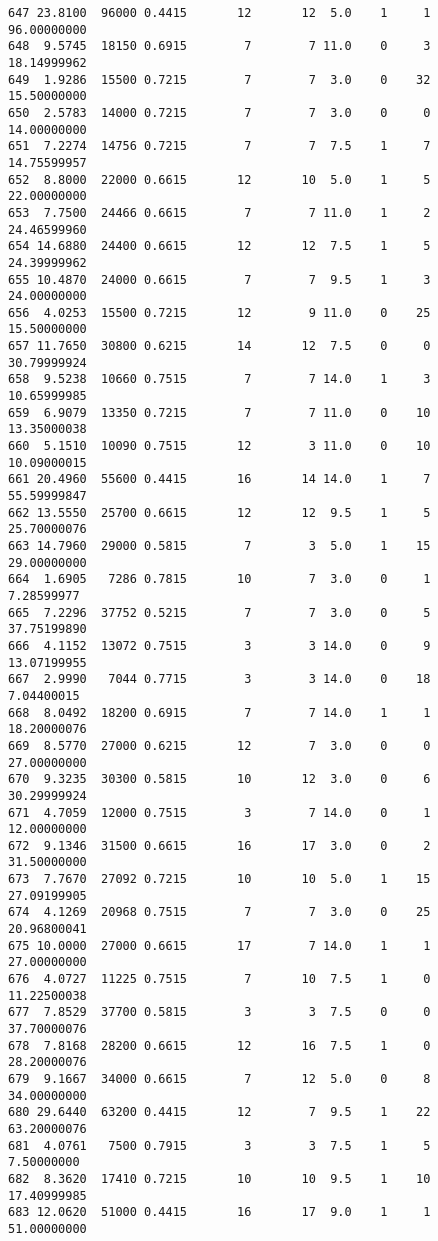 \documentclass[
  letterpaper,
  DIV=11,
  numbers=noendperiod]{scrreprt}
\begin{document}
\begin{verbatim}
647 23.8100  96000 0.4415       12       12  5.0    1     1 96.00000000
648  9.5745  18150 0.6915        7        7 11.0    0     3 18.14999962
649  1.9286  15500 0.7215        7        7  3.0    0    32 15.50000000
650  2.5783  14000 0.7215        7        7  3.0    0     0 14.00000000
651  7.2274  14756 0.7215        7        7  7.5    1     7 14.75599957
652  8.8000  22000 0.6615       12       10  5.0    1     5 22.00000000
653  7.7500  24466 0.6615        7        7 11.0    1     2 24.46599960
654 14.6880  24400 0.6615       12       12  7.5    1     5 24.39999962
655 10.4870  24000 0.6615        7        7  9.5    1     3 24.00000000
656  4.0253  15500 0.7215       12        9 11.0    0    25 15.50000000
657 11.7650  30800 0.6215       14       12  7.5    0     0 30.79999924
658  9.5238  10660 0.7515        7        7 14.0    1     3 10.65999985
659  6.9079  13350 0.7215        7        7 11.0    0    10 13.35000038
660  5.1510  10090 0.7515       12        3 11.0    0    10 10.09000015
661 20.4960  55600 0.4415       16       14 14.0    1     7 55.59999847
662 13.5550  25700 0.6615       12       12  9.5    1     5 25.70000076
663 14.7960  29000 0.5815        7        3  5.0    1    15 29.00000000
664  1.6905   7286 0.7815       10        7  3.0    0     1  7.28599977
665  7.2296  37752 0.5215        7        7  3.0    0     5 37.75199890
666  4.1152  13072 0.7515        3        3 14.0    0     9 13.07199955
667  2.9990   7044 0.7715        3        3 14.0    0    18  7.04400015
668  8.0492  18200 0.6915        7        7 14.0    1     1 18.20000076
669  8.5770  27000 0.6215       12        7  3.0    0     0 27.00000000
670  9.3235  30300 0.5815       10       12  3.0    0     6 30.29999924
671  4.7059  12000 0.7515        3        7 14.0    0     1 12.00000000
672  9.1346  31500 0.6615       16       17  3.0    0     2 31.50000000
673  7.7670  27092 0.7215       10       10  5.0    1    15 27.09199905
674  4.1269  20968 0.7515        7        7  3.0    0    25 20.96800041
675 10.0000  27000 0.6615       17        7 14.0    1     1 27.00000000
676  4.0727  11225 0.7515        7       10  7.5    1     0 11.22500038
677  7.8529  37700 0.5815        3        3  7.5    0     0 37.70000076
678  7.8168  28200 0.6615       12       16  7.5    1     0 28.20000076
679  9.1667  34000 0.6615        7       12  5.0    0     8 34.00000000
680 29.6440  63200 0.4415       12        7  9.5    1    22 63.20000076
681  4.0761   7500 0.7915        3        3  7.5    1     5  7.50000000
682  8.3620  17410 0.7215       10       10  9.5    1    10 17.40999985
683 12.0620  51000 0.4415       16       17  9.0    1     1 51.00000000

\end{verbatim}
\end{document}
